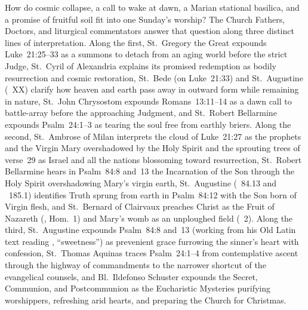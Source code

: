How do cosmic collapse, a call to wake at dawn, a Marian stational basilica, and a promise of fruitful soil fit into one Sunday's worship? The Church Fathers, Doctors, and liturgical commentators answer that question along three distinct lines of interpretation. Along the first, St.~Gregory the Great expounds Luke~21:25--33 as a summons to detach from an aging world before the strict Judge, St.~Cyril of Alexandria explains its promised redemption as bodily resurrection and cosmic restoration, St.~Bede (on Luke~21:33) and St.~Augustine (~XX) clarify how heaven and earth pass away in outward form while remaining in nature, St.~John Chrysostom expounds Romans~13:11--14 as a dawn call to battle-array before the approaching Judgment, and St.~Robert Bellarmine expounds Psalm~24:1--3 as tearing the soul free from earthly briers. Along the second, St.~Ambrose of Milan interprets the cloud of Luke~21:27 as the prophets and the Virgin Mary overshadowed by the Holy Spirit and the sprouting trees of verse~29 as Israel and all the nations blossoming toward resurrection, St.~Robert Bellarmine hears in Psalm~84:8 and~13 the Incarnation of the Son through the Holy Spirit overshadowing Mary's virgin earth, St.~Augustine (~84.13 and ~185.1) identifies Truth sprung from earth in Psalm~84:12 with the Son born of Virgin flesh, and St.~Bernard of Clairvaux preaches Christ as the Fruit of Nazareth (, Hom.~1) and Mary's womb as an unploughed field (~2). Along the third, St.~Augustine expounds Psalm~84:8 and~13 (working from his Old Latin text reading , ``sweetness'') as prevenient grace furrowing the sinner's heart with confession, St.~Thomas Aquinas traces Psalm~24:1--4 from contemplative ascent through the highway of commandments to the narrower shortcut of the evangelical counsels, and Bl.~Ildefonso Schuster expounds the Secret, Communion, and Postcommunion as the Eucharistic Mysteries purifying worshippers, refreshing arid hearts, and preparing the Church for Christmas.

